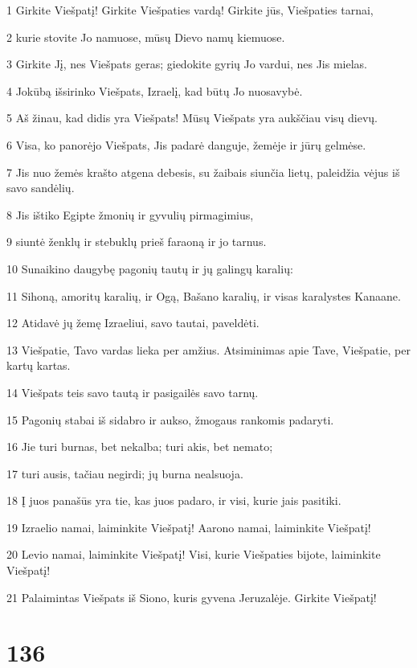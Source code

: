 \par 1 Girkite Viešpatį! Girkite Viešpaties vardą! Girkite jūs, Viešpaties tarnai, 
\par 2 kurie stovite Jo namuose, mūsų Dievo namų kiemuose. 
\par 3 Girkite Jį, nes Viešpats geras; giedokite gyrių Jo vardui, nes Jis mielas. 
\par 4 Jokūbą išsirinko Viešpats, Izraelį, kad būtų Jo nuosavybė. 
\par 5 Aš žinau, kad didis yra Viešpats! Mūsų Viešpats yra aukščiau visų dievų. 
\par 6 Visa, ko panorėjo Viešpats, Jis padarė danguje, žemėje ir jūrų gelmėse. 
\par 7 Jis nuo žemės krašto atgena debesis, su žaibais siunčia lietų, paleidžia vėjus iš savo sandėlių. 
\par 8 Jis ištiko Egipte žmonių ir gyvulių pirmagimius, 
\par 9 siuntė ženklų ir stebuklų prieš faraoną ir jo tarnus. 
\par 10 Sunaikino daugybę pagonių tautų ir jų galingų karalių: 
\par 11 Sihoną, amoritų karalių, ir Ogą, Bašano karalių, ir visas karalystes Kanaane. 
\par 12 Atidavė jų žemę Izraeliui, savo tautai, paveldėti. 
\par 13 Viešpatie, Tavo vardas lieka per amžius. Atsiminimas apie Tave, Viešpatie, per kartų kartas. 
\par 14 Viešpats teis savo tautą ir pasigailės savo tarnų. 
\par 15 Pagonių stabai iš sidabro ir aukso, žmogaus rankomis padaryti. 
\par 16 Jie turi burnas, bet nekalba; turi akis, bet nemato; 
\par 17 turi ausis, tačiau negirdi; jų burna nealsuoja. 
\par 18 Į juos panašūs yra tie, kas juos padaro, ir visi, kurie jais pasitiki. 
\par 19 Izraelio namai, laiminkite Viešpatį! Aarono namai, laiminkite Viešpatį! 
\par 20 Levio namai, laiminkite Viešpatį! Visi, kurie Viešpaties bijote, laiminkite Viešpatį! 
\par 21 Palaimintas Viešpats iš Siono, kuris gyvena Jeruzalėje. Girkite Viešpatį!


\chapter{136}


